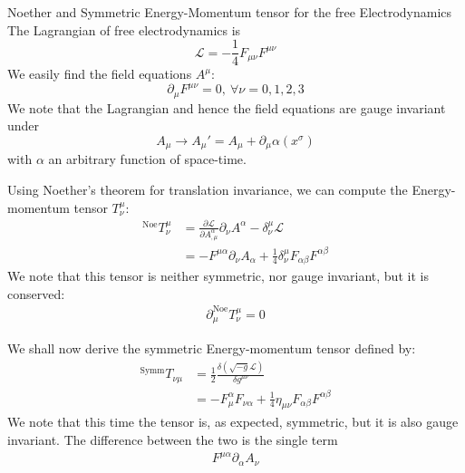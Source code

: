 \begin{section}{Noether and Symmetric Energy-Momentum tensor for the free Electrodynamics}
  The Lagrangian of free electrodynamics is
  \begin{equation}
    \mathcal{L} = -\frac{1}{4}F_{\mu\nu}F^{\mu\nu}
  \end{equation}
  We easily find the field equations  $A^{\mu}$:
  \begin{equation}
    \partial_{\mu}F^{\mu\nu} = 0,\ \forall \nu = 0,1,2,3
  \end{equation}
  We note that the Lagrangian and hence the field equations are gauge
  invariant under
  \begin{equation}
    A_{\mu} \rightarrow A_\mu'=A_{\mu}+\partial_\mu\alpha(x^\sigma)
  \end{equation}
  with $\alpha$ an arbitrary function of space-time.
  
  Using Noether's theorem for translation invariance, we can compute
  the Energy-momentum tensor $T^\mu_\nu$:
  \begin{align}
    ^{\text{Noe}}T^\mu_\nu & = \frac{\partial \mathcal{L}}{\partial A^\alpha_{,\mu}} \partial_\nu A^\alpha-\delta_\nu^\mu\mathcal{L}\\
    & = -F^{\mu\alpha}\partial_\nu A_{\alpha}+\frac{1}{4}\delta_\nu^\mu F_{\alpha \beta}F^{\alpha\beta}
  \end{align}
  We note that this tensor is neither symmetric, nor gauge invariant, but it is conserved:
  \begin{align}
    \partial_\mu ^{\text{Noe}}T_{\nu}^\mu = 0
  \end{align}

  We shall now derive the symmetric Energy-momentum tensor defined by:
  \begin{align}
    ^{\text{Symm}}T_{\nu\mu} & = \frac{1}{2}\frac{\delta\left(\sqrt{-g}\mathcal{L}\right)}{\delta g^{\mu\nu}}\\
    & = -F_{\mu}^\alpha F_{\nu\alpha}+\frac{1}{4}\eta_{\mu\nu} F_{\alpha\beta}F^{\alpha\beta}
  \end{align}
  We note that this time the tensor is, as expected, symmetric, but it is also gauge invariant. The difference between the two is the single term
  \begin{align}
    F^{\mu\alpha}\partial_{\alpha}A_\nu
  \end{align}
\end{section}

